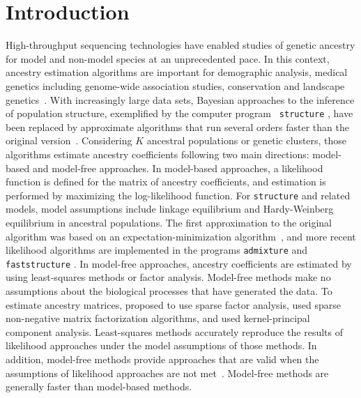 \section{Introduction}

High-throughput sequencing technologies have enabled studies of genetic ancestry
for model and non-model species at an unprecedented pace. In this context,
ancestry estimation algorithms are important for demographic analysis, medical
genetics including genome-wide association studies, conservation and landscape
genetics~\citep{Pritchard2000, Tang2005, Schraiber2015, Segelbacher2010,
  Francois2015}. With increasingly large data sets, Bayesian approaches to the
inference of population structure, exemplified by the computer program {\tt
  structure} \citep{Pritchard2000}, have been replaced by approximate algorithms
that run several orders faster than the original version~\citep{Tang2005,
  Alexander2011, Frichot2014, Raj2014}. Considering $K$ ancestral populations or
genetic clusters, those algorithms estimate ancestry coefficients following two
main directions: model-based and model-free approaches. In model-based
approaches, a likelihood function is defined for the matrix of ancestry
coefficients, and estimation is performed by maximizing the log-likelihood
function. For {\tt structure} and related models, model assumptions include
linkage equilibrium and Hardy-Weinberg equilibrium in ancestral populations. The
first approximation to the original algorithm was based on an
expectation-minimization algorithm~\citep{Tang2005}, and more recent likelihood
algorithms are implemented in the programs {\tt admixture} and {\tt
  faststructure} \citep{Alexander2011, Raj2014}. In model-free approaches,
ancestry coefficients are estimated by using least-squares methods or factor
analysis. Model-free methods make no assumptions about the biological processes
that have generated the data. To estimate ancestry matrices,
\cite{Engelhardt2010} proposed to use sparse factor analysis, \cite{Frichot2014}
used sparse non-negative matrix factorization algorithms, and \cite{Popescu2014}
used kernel-principal component analysis. Least-squares methods accurately
reproduce the results of likelihood approaches under the model assumptions of
those methods. In addition, model-free methods provide approaches that are valid
when the assumptions of likelihood approaches are not met~\citep{Frichot2014}.
Model-free methods are generally faster than model-based methods.
   
